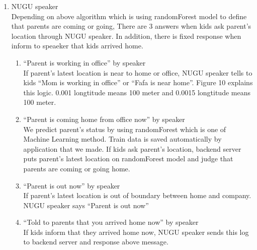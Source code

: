 \documentclass[conference]{IEEEtran}
\begin{document}
\begin{enumerate}
    \item NUGU speaker\\
    Depending on above algorithm which is using randomForest model to define that parents are coming or going, There are 3 answers when kids ask parent’s location through NUGU speaker. In addition, there is fixed response when inform to speaeker that kids arrived home.
    \begin{enumerate}
        \item “Parent is working in office” by speaker\\
        If parent’s latest location is near to home or office, NUGU speaker tells to kids “Mom is working in office” or “Fafa is near home”. Figure 10 explains this logic. 0.001 longtitude means 100 meter and 0.0015 longtitude means 100 meter.\\
        \item “Parent is coming home from office now” by speaker\\
        We predict parent’s status by using randomForest which is one of Machine Learning method. Train data is saved automatically by application that we made. If kids ask parent’s location, backend server puts parent’s latest location on randomForest model and judge that parents are coming or going home.\\
        \item “Parent is out now” by speaker\\
        If parent’s latest location is out of boundary between home and company. NUGU speaker says “Parent is out now”\\
        \item “Told to parents that you arrived home now” by speaker\\
        If kids inform that they arrived home now, NUGU speaker sends this log to backend server and response above message.\\
    \end{enumerate}
\end{enumerate}
\end{document}
